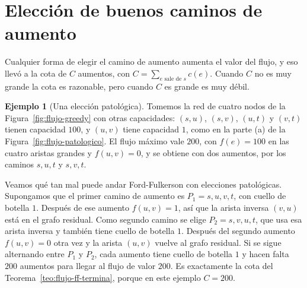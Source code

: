 \documentclass[12pt, spanish, oneside, openany]{book}
\theoremstyle{uprightplain}
\theoremstyle{definition}
\newtheorem{ejemplo}[teorema]{Ejemplo}
\theoremstyle{remark}
\theoremstyle{definition}
\begin{document}
\section{Elección de buenos caminos de aumento}
\label{sec:flujo-escalamiento}

Cualquier forma de elegir el camino de aumento aumenta el valor del flujo, y eso llevó a la cota de $C$ aumentos, con $C=\sum_{e\text{ sale de }s}c(e)$. Cuando $C$ no es muy grande la cota es razonable, pero cuando $C$ es grande es muy débil.

\begin{ejemplo}[Una elección patológica]
\label{ej:flujo-patologico}
Tomemos la red de cuatro nodos de la Figura~\ref{fig:flujo-greedy} con otras capacidades: $(s,u)$, $(s,v)$, $(u,t)$ y $(v,t)$ tienen capacidad $100$, y $(u,v)$ tiene capacidad $1$, como en la parte (a) de la Figura~\ref{fig:flujo-patologico}. El flujo máximo vale $200$, con $f(e)=100$ en las cuatro aristas grandes y $f(u,v)=0$, y se obtiene con dos aumentos, por los caminos $s,u,t$ y $s,v,t$.

Veamos qué tan mal puede andar Ford-Fulkerson con elecciones patológicas. Supongamos que el primer camino de aumento es $P_1=s,u,v,t$, con cuello de botella $1$. Después de ese aumento $f(u,v)=1$, así que la arista inversa $(v,u)$ está en el grafo residual. Como segundo camino se elige $P_2=s,v,u,t$, que usa esa arista inversa y también tiene cuello de botella $1$. Después del segundo aumento $f(u,v)=0$ otra vez y la arista $(u,v)$ vuelve al grafo residual. Si se sigue alternando entre $P_1$ y $P_2$, cada aumento tiene cuello de botella $1$ y hacen falta $200$ aumentos para llegar al flujo de valor $200$. Es exactamente la cota del Teorema~\ref{teo:flujo-ff-termina}, porque en este ejemplo $C=200$.
\end{ejemplo}
\end{document}
